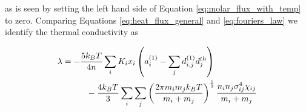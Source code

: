 as is seen by setting the left hand side of Equation \eqref{eq:molar_flux_with_temp} to zero. Comparing Equations \eqref{eq:heat_flux_general} and \eqref{eq:fouriers_law} we identify the thermal conductivity as

\begin{equation}
    \begin{split}
        \lambda &= - \frac{5 k_B T}{4n} \sum_i K_i x_i \left( a_i^{(1)} - \sum_j d_{i,j}^{(1)} d_j^{th}\right) \\
        &\hspace{1cm} - \frac{4 k_B T}{3} \sum_i \sum_j \left(\frac{2\pi m_i m_j k_B T}{m_i + m_j}\right)^{\frac{1}{2}} \frac{n_i n_j \sigma_{ij}^4 \chi_{ij}}{m_i + m_j}
    \end{split}
\end{equation}